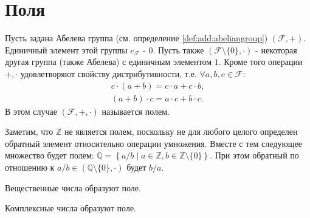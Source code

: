 \section{Поля}
\begin{definition}
  Пусть задана Абелева группа (см. определение
  \ref{def:add:abeliangroup})  
  $(\mathcal{F}, +)$. Единичный элемент этой группы $e_\mathcal{F}$ -
  $0$. Пусть также $(\mathcal{F} \setminus \{0\}, \cdot)$ - некоторая
  другая группа (также Абелева) с единичным элементом $1$. Кроме того операции
  $+,\cdot$ удовлетворяют свойству дистрибутивности, т.е. $\forall
  a,b,c \in \mathcal{F}$:
  \begin{eqnarray}
  c \cdot \left(a + b\right) = c \cdot a + c \cdot b,
  \nonumber \\
  \left(a + b\right) \cdot c = a \cdot c + b \cdot c.
  \nonumber
  \end{eqnarray}
  В этом случае $(\mathcal{F}, +, \cdot)$ называется полем.
  \label{def:field}
\end{definition}

\begin{example}
  Заметим, что $\mathbb{Z}$ не является полем, поскольку не для любого
  целого определен обратный элемент относительно операции умножения. 
  Вместе с тем следующее множество будет полем: $\mathbb{Q} =
  \left\{a/b \mid a \in \mathbb{Z}, b \in 
  \mathbb{Z}\setminus\{0\}\right\}$. При этом обратный по отношению к
  $a/b \in \left(\mathbb{Q}\setminus\{0\}, \cdot\right)$ будет $b/a$.
  \label{ex:field_q}
\end{example}

\begin{example}
  Вещественные числа образуют поле.
  \label{ex:field_r}
\end{example}

\begin{example}
  Комплексные числа образуют поле.
  \label{ex:field_c}
\end{example}
